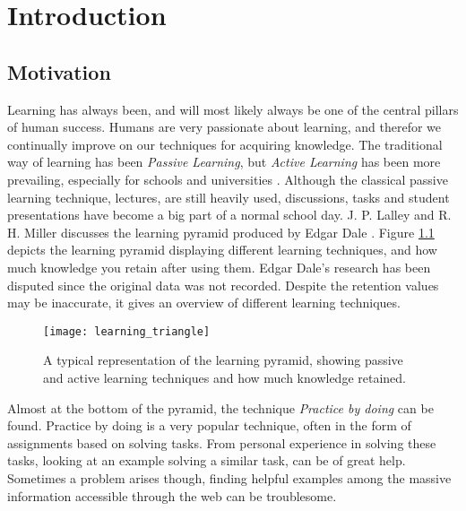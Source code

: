 
\chapter{Introduction} \label{cap_1}

\section{Motivation}

Learning has always been, and will most likely always be one of the central pillars of human success. Humans are very passionate about learning, and therefor we continually improve on our techniques for acquiring knowledge. The traditional way of learning has been \textit{Passive Learning}, but \textit{Active Learning} has been more prevailing, especially for schools and universities \cite{active-learning}. Although the classical passive learning technique, lectures, are still heavily used, discussions, tasks and student presentations have become a big part of a normal school day. J. P. Lalley and R. H. Miller discusses the learning pyramid produced by Edgar Dale \cite{learning_pyramid}. Figure \ref{fig:lt} depicts the learning pyramid displaying different learning techniques, and how much knowledge you retain after using them. Edgar Dale's research has been disputed since the original data was not recorded. Despite the retention values may be inaccurate, it gives an overview of different learning techniques. 

\begin{figure}[h] 
\caption{A typical representation of the learning pyramid, showing passive and active learning techniques and how much knowledge retained.}
\texttt{[image: learning\_triangle]}
\label{fig:lt}
\end{figure}

Almost at the bottom of the pyramid, the technique \textit{Practice by doing} can be found. Practice by doing is a very popular technique, often in the form of assignments based on solving tasks. From personal experience in solving these tasks, looking at an example solving a similar task, can be of great help. Sometimes a problem arises though, finding helpful examples among the massive information accessible through the web can be troublesome.

